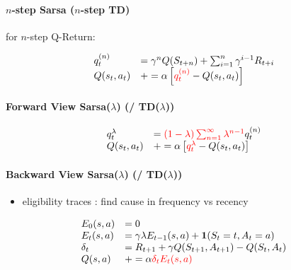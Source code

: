 \documentclass[10pt,landscape]{article}
\begin{document}
\begin{multicols}{3}
\paragraph{\texorpdfstring{$n$}{n}-step Sarsa (\texorpdfstring{$n$}{n}-step TD)}

for $n$-step Q-Return:

\begin{equation}
    \begin{array}{l l}
        q_{t}^{(n)} &= \gamma^n Q(S_{t+n}) + \sum_{i=1}^{n} \gamma^{i-1} R_{t+i}\\
        Q(s_t, a_t) &+= \alpha \left[\textcolor{red}{q_t^{(n)}} - Q(s_t, a_t) \right]\\
    \end{array}
\end{equation}

\paragraph{Forward View Sarsa(\texorpdfstring{$\lambda$}{lambda}) (/ TD(\texorpdfstring{$\lambda$}{lambda}))}

\begin{equation}
    \begin{array}{l l}
        q_t^\lambda &= \textcolor{red}{(1-\lambda) \sum_{n=1}^\infty \lambda^{n-1}} q_t^{(n)}\\
        Q(s_t, a_t) &+= \alpha \left[\textcolor{red}{q_t^\lambda} - Q(s_t, a_t) \right]\\
    \end{array}
\end{equation}

\paragraph{Backward View Sarsa(\texorpdfstring{$\lambda$}{lambda}) (/ TD(\texorpdfstring{$\lambda$}{lambda}))}

\begin{itemize}
    \pro more efficient
    \pro can update at every time-step
    \item eligibility traces %
        : find cause in frequency vs recency
\end{itemize}

\begin{equation}
    \begin{array}{l l}
        E_0(s,a) &= 0\\
        E_t(s,a) &= \gamma \lambda E_{t-1}(s,a) + \textbf{1}(S_t=t,A_t=a)\\
        \delta_t &= R_{t+1} + \gamma Q(S_{t+1},A_{t+1}) - Q(S_t,A_t)\\
        Q(s,a) &+= \alpha \textcolor{red}{\delta_t E_t(s,a)}\\
    \end{array}
\end{equation}


\end{multicols}
\end{document}
